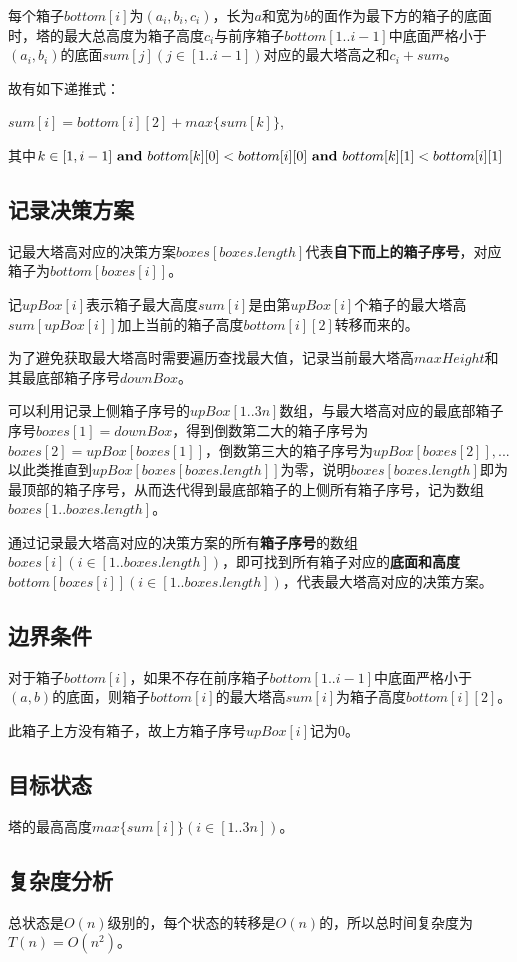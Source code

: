 \documentclass{article}
\begin{document}
每个箱子$bottom[i]$为$(a_i,b_i,c_i)$，长为$a$和宽为$b$的面作为最下方的箱子的底面时，塔的最大总高度为箱子高度$c_i$与前序箱子$bottom[1..i-1]$中底面严格小于$(a_i,b_i)$的底面$sum[j](j\in [1..i-1])$对应的最大塔高之和$c_i+sum$。

故有如下递推式：

$sum[i]=bottom[i][2]+max\{sum[k]\}$,

其中$k\in [1,i-1]\ {\bf and}\ bottom[k][0]<bottom[i][0]\ {\bf and}\ bottom[k][1]<bottom[i][1]$

\subsection{记录决策方案}
记最大塔高对应的决策方案$boxes[boxes.length]$代表\textbf{自下而上的箱子序号}，对应箱子为$bottom[boxes[i]]$。

记$upBox[i]$表示箱子最大高度$sum[i]$是由第$upBox[i]$个箱子的最大塔高$sum[upBox[i]]$加上当前的箱子高度$bottom[i][2]$转移而来的。

为了避免获取最大塔高时需要遍历查找最大值，记录当前最大塔高$maxHeight$和其最底部箱子序号$downBox$。

可以利用记录上侧箱子序号的$upBox[1..3n]$数组，与最大塔高对应的最底部箱子序号$boxes[1]=downBox$，得到倒数第二大的箱子序号为$boxes[2]=upBox[boxes[1]]$，倒数第三大的箱子序号为$upBox[boxes[2]],...$以此类推直到$upBox[boxes[boxes.length]]$为零，说明$boxes[boxes.length]$即为最顶部的箱子序号，从而迭代得到最底部箱子的上侧所有箱子序号，记为数组$boxes[1..boxes.length]$。

通过记录最大塔高对应的决策方案的所有\textbf{箱子序号}的数组$boxes[i](i\in [1..boxes.length])$，即可找到所有箱子对应的\textbf{底面和高度}$bottom[boxes[i]](i\in [1..boxes.length])$，代表最大塔高对应的决策方案。

\subsection{边界条件}
对于箱子$bottom[i]$，如果不存在前序箱子$bottom[1..i-1]$中底面严格小于$(a,b)$的底面，则箱子$bottom[i]$的最大塔高$sum[i]$为箱子高度$bottom[i][2]$。

此箱子上方没有箱子，故上方箱子序号$upBox[i]$记为$0$。

\subsection{目标状态}
塔的最高高度$max\{sum[i]\}(i\in [1..3n])$。

\subsection{复杂度分析}
总状态是$O(n)$级别的，每个状态的转移是$O(n)$的，所以总时间复杂度为$T(n)=O(n^2)$。
\end{document}
